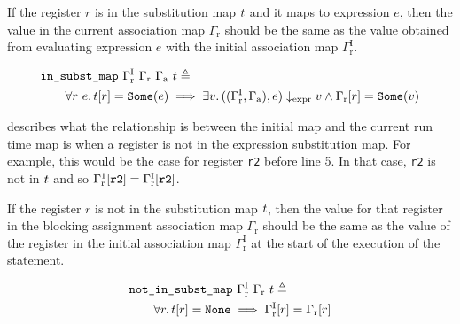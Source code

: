 \begin{definition}%
  \label{def:in-substitution-map}

  If the register $r$ is in the substitution map $t$ and it maps to
  expression $e$, then the value in the current association map
  $\Gamma_{\mathrm r}$ should be the same as the value obtained from evaluating
  expression $e$ with the initial association map
  $\Gamma^{\mathrm{I}}_{\mathrm r}$.

  \begin{equation*}
    \begin{aligned}
      &\texttt{in\_subst\_map}\ \Gamma^{\mathrm{I}}_{\mathrm r}\ \Gamma_{\mathrm r}\ \Gamma_{\mathrm a}\ t \triangleq \\
      &\qquad \forall r\ e\ldotp t\!\left[r\right] = \texttt{Some}(e) \implies \exists v\ldotp
      ((\Gamma^{\mathrm{I}}_{\mathrm r}, \Gamma_{\mathrm a}), e) \downarrow_{\text{expr}} v
      \land \Gamma_{\mathrm r}\!\left[r\right] = \texttt{Some}(v)
    \end{aligned}
  \end{equation*}
\end{definition}

 describes what the relationship is between
the initial map and the current run time map is when a register is not in the
expression substitution map.  For example, this would be the case for register
\texttt{r2} before line 5.  In that case, \texttt{r2} is not in $t$ and
so
${\Gamma}^{1}_{\mathrm r}\!\left[\texttt{r2}\right] =
{\Gamma}^{\mathrm I}_{\mathrm r}\!\left[\texttt{r2}\right]$.

\begin{definition}%
  \label{def:hg:not-in-substitution-map}

  If the register $r$ is not in the substitution map $t$, then the value
  for that register in the blocking assignment association map
  $\Gamma_{\mathrm r}$ should be the same as the value of the register in the
  initial association map $\Gamma^{\mathrm{I}}_{\mathrm r}$ at the start of the
  execution of the statement.

  \begin{equation*}
    \begin{aligned}
      &\texttt{not\_in\_subst\_map}\ \Gamma^{\mathrm{I}}_{\mathrm r}\ \Gamma_{\mathrm r}\ t
      \triangleq \\
      &\qquad\forall r\ldotp t\!\left[r\right] = \texttt{None} \implies \Gamma^{\mathrm{I}}_{\mathrm r}\!\left[r\right] =
      \Gamma_{\mathrm r}\!\left[r\right]
    \end{aligned}
  \end{equation*}
\end{definition}


